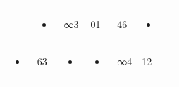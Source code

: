 \documentclass[
  11pt,
  a4paper]{book}
\begin{document}
\begin{longtable}[]{@{}lllllll@{}}
\begin{minipage}[t]{0.06\columnwidth}
\end{minipage} & \begin{minipage}[t]{0.06\columnwidth}\raggedright
\begin{itemize}
\item
\end{itemize}\strut
\end{minipage} & \begin{minipage}[t]{0.06\columnwidth}\raggedright
∞3\strut
\end{minipage} & \begin{minipage}[t]{0.06\columnwidth}\raggedright
01\strut
\end{minipage} & \begin{minipage}[t]{0.06\columnwidth}\raggedright
46\strut
\end{minipage} & \begin{minipage}[t]{0.06\columnwidth}\raggedright
\begin{itemize}
\item
\end{itemize}\strut
\end{minipage}\tabularnewline
\begin{minipage}[t]{0.06\columnwidth}\raggedright
\begin{itemize}
\item
\end{itemize}\strut
\end{minipage} & \begin{minipage}[t]{0.06\columnwidth}\raggedright
63\strut
\end{minipage} & \begin{minipage}[t]{0.06\columnwidth}\raggedright
\begin{itemize}
\item
\end{itemize}\strut
\end{minipage} & \begin{minipage}[t]{0.06\columnwidth}\raggedright
\begin{itemize}
\item
\end{itemize}\strut
\end{minipage} & \begin{minipage}[t]{0.06\columnwidth}\raggedright
∞4\strut
\end{minipage} & \begin{minipage}[t]{0.06\columnwidth}\raggedright
12\strut
\end{minipage} & \begin{minipage}[t]{0.06\columnwidth}\raggedright

\end{minipage}
\end{longtable}
\end{document}
